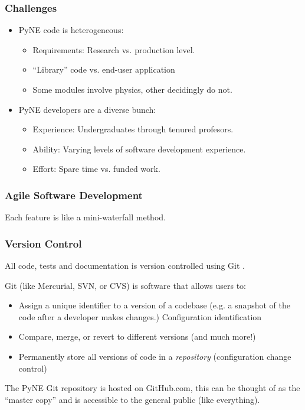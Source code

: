 \documentclass[12pt]{beamer}
\begin{document}
\begin{frame}[fragile]
\frametitle{Challenges}

\begin{itemize}
\item{PyNE code is heterogeneous:}
    \begin{itemize}
    \item{Requirements: Research vs. production level.}
    \item{``Library'' code vs. end-user application}
    \item{Some modules involve physics, other decidingly do not.}
    \end{itemize}
\item{PyNE developers are a diverse bunch}:
   \begin{itemize}
   \item{Experience: Undergraduates through tenured profesors.}
   \item{Ability: Varying levels of software development experience.}
   \item{Effort: Spare time vs. funded work.}
   \end{itemize}
\end{itemize}

\end{frame}
\begin{frame}
\frametitle{Agile Software Development}

Each feature is like a mini-waterfall method.

\cite{larman2004agile}

\end{frame}


\begin{frame}
\frametitle{Version Control}

All code, tests and documentation is version controlled using Git \cite{git}.

Git (like Mercurial, SVN, or CVS) is software that allows users to:
\begin{itemize}
\item{Assign a unique identifier to a version of a codebase (e.g. a snapshot of the code after a developer makes changes.) \alert{Configuration identification}}
\item{Compare, merge, or revert to different versions (and much more!)}
\item{Permanently store all versions of code in a \emph{repository} (\alert{configuration change control})}
\end{itemize}

The PyNE Git repository is hosted on GitHub.com, this can be thought of as the
``master copy'' and is accessible to the general public (like everything). 

\end{frame}
\end{document}

